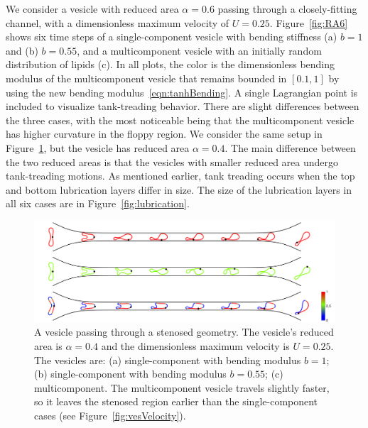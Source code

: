 \documentclass[twoside,twocolumn,9pt]{article}
\newcommand{\subfigimg}[3][,]{%
  \setbox1=\hbox{\texttt{[image: \#3]}}%
  \leavevmode\rlap{\usebox1}%
  \rlap{\hspace*{0pt}\raisebox{\dimexpr\ht1-0\baselineskip}{\bf
  \normalsize #2}}%
  \phantom{\usebox1}%
}
\begin{document}
We consider a vesicle with reduced area $\alpha = 0.6$ passing through a
closely-fitting channel, with a dimensionless maximum velocity of $U =
0.25$. Figure~\ref{fig:RA6} shows six time steps of a single-component
vesicle with bending stiffness (a) $b=1$ and (b) $b=0.55$, and a
multicomponent vesicle with an initially random distribution of lipids
(c). In all plots, the color is the dimensionless bending modulus of the
multicomponent vesicle that remains bounded in $[0.1,1]$ by using the
new bending modulus~\eqref{eqn:tanhBending}. A single Lagrangian point
is included to visualize tank-treading behavior. There are slight
differences between the three cases, with the most noticeable being that
the multicomponent vesicle has higher curvature in the floppy region. We
consider the same setup in Figure~\ref{fig:RA4}, but the vesicle has
reduced area $\alpha = 0.4$. The main difference between the two reduced
areas is that the vesicles with smaller reduced area undergo
tank-treading motions. As mentioned earlier, tank treading occurs when
the top and bottom lubrication layers differ in size. The size of the
lubrication layers in all six cases are in Figure~\ref{fig:lubrication}. 


\begin{figure}[t]
  \centering
  \includegraphics[width=0.9\linewidth]{figures/STENOSIS_RAp4MCp5.pdf}
  \caption{\label{fig:RA4} \small A vesicle passing through a stenosed
  geometry. The vesicle's reduced area is $\alpha = 0.4$ and the
  dimensionless maximum velocity is $U = 0.25$. The vesicles are: (a)
  single-component with bending modulus $b=1$; (b) single-component with
  bending modulus $b=0.55$; (c) multicomponent. The multicomponent
  vesicle travels slightly faster, so it leaves the stenosed region
  earlier than the single-component cases (see
  Figure~\ref{fig:vesVelocity}).}
\end{figure}
\end{document}
